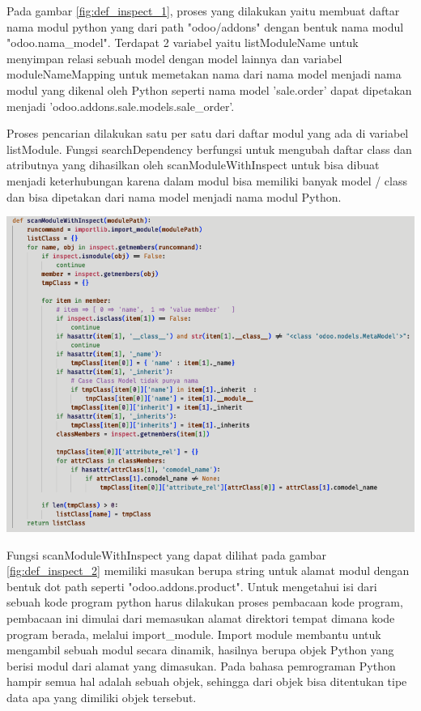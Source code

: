 Pada gambar \ref{fig:def_inspect_1}, proses yang dilakukan yaitu membuat daftar nama modul python yang dari path "odoo/addons" dengan bentuk nama modul "odoo.nama{\_}model". Terdapat 2 variabel yaitu listModuleName untuk menyimpan relasi sebuah model dengan model lainnya dan variabel moduleNameMapping untuk memetakan nama dari nama model menjadi nama modul yang dikenal oleh Python seperti nama model 'sale.order' dapat dipetakan menjadi 'odoo.addons.sale.models.sale{\_}order'.

Proses pencarian dilakukan satu  per satu dari daftar modul yang ada di variabel listModule. Fungsi searchDependency berfungsi untuk mengubah daftar class dan atributnya yang dihasilkan oleh scanModuleWithInspect untuk bisa dibuat menjadi keterhubungan karena dalam modul bisa memiliki banyak model / class dan bisa dipetakan dari nama model menjadi nama modul Python.  

\begin{center}
	\includegraphics[width=14cm]{img/bab_4/def_inspect_2.png}
	\label{fig:def_inspect_2}
\end{center}

Fungsi scanModuleWithInspect yang dapat dilihat pada gambar \ref{fig:def_inspect_2} memiliki masukan berupa string untuk alamat modul dengan bentuk dot path seperti "odoo.addons.product".  Untuk mengetahui isi dari sebuah kode program python harus dilakukan proses pembacaan kode program, pembacaan ini dimulai dari memasukan alamat direktori tempat dimana kode program berada, melalui import{\_}module. Import module membantu untuk mengambil sebuah modul secara dinamik, hasilnya berupa objek Python yang berisi modul dari alamat yang dimasukan. Pada bahasa pemrograman Python hampir semua hal adalah sebuah objek, sehingga dari objek bisa ditentukan tipe data apa yang dimiliki objek tersebut.

